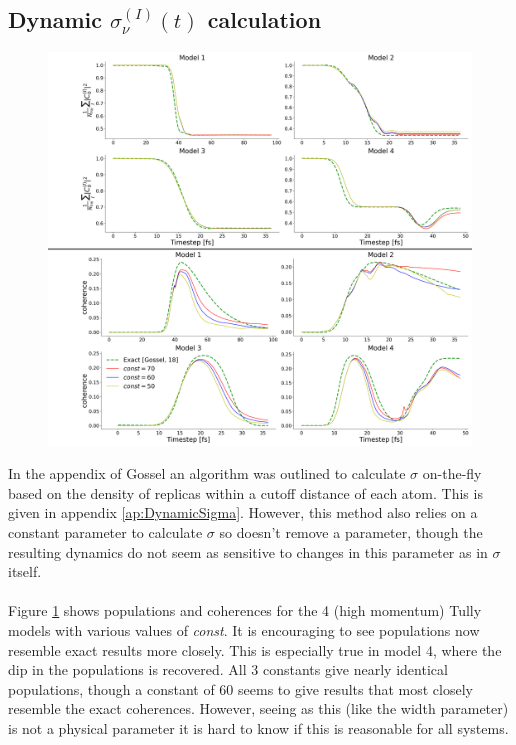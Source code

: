 \subsection{Dynamic $\sigma^{(I)}_{\nu}(t)$ calculation}
\begin{figure}[ht]
  \includegraphics[width=\textwidth]{../img/CTMQC/TullyModels/CTMQC_dynSig_highMom.png}
	\caption{\label{fig:dynamicSigma}}
\end{figure}
In the appendix of Gossel \cite{gossel_coupled-trajectory_2018} an algorithm was outlined to calculate $\sigma$ on-the-fly based on the density of replicas within a cutoff distance of each atom. This is given in appendix \ref{ap:DynamicSigma}. However, this method also relies on a constant parameter to calculate $\sigma$ so doesn't remove a parameter, though the resulting dynamics do not seem as sensitive to changes in this parameter as in $\sigma$ itself.
\\\\
Figure \ref{fig:dynamicSigma} shows populations and coherences for the 4 (high momentum) Tully models with various values of \textit{const}. It is encouraging to see populations now resemble exact results more closely. This is especially true in model 4, where the dip in the populations is recovered. All 3 constants give nearly identical populations, though a constant of 60 seems to give results that most closely resemble the exact coherences. However, seeing as this (like the width parameter) is not a physical parameter it is hard to know if this is reasonable for all systems. 
